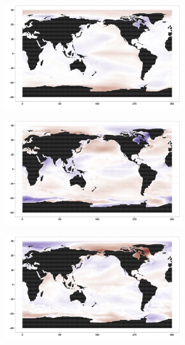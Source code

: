 \begin{figure}[h!bt]
  \centering
  \begin{subfigure}{.3\textwidth}
    \centering
    \includegraphics[width=.9\linewidth]{images/EOF3_0.png}
  \end{subfigure}
  \begin{subfigure}{.3\textwidth}
    \centering
    \includegraphics[width=.9\linewidth]{images/EOF6_0.png}
  \end{subfigure}
  \begin{subfigure}{.3\textwidth}
    \centering
    \includegraphics[width=.9\linewidth]{images/EOF7_0.png}

\end{subfigure}
\end{figure}
